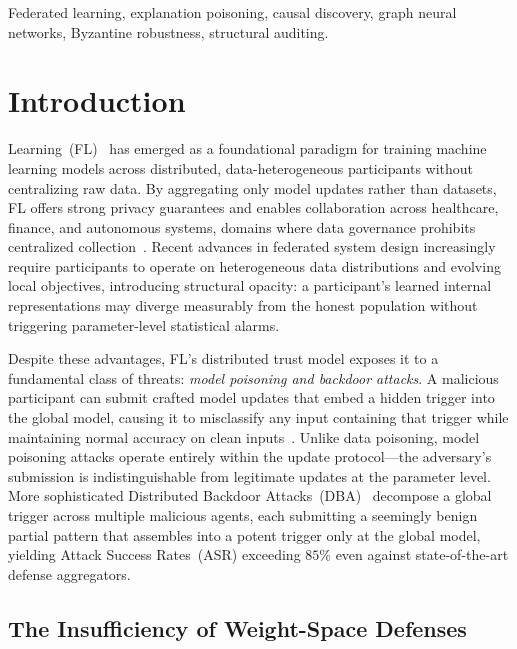 \documentclass[journal]{IEEEtran}
\begin{document}
\begin{IEEEkeywords}
Federated learning, explanation poisoning, causal discovery,
graph neural networks, Byzantine robustness, structural auditing.
\end{IEEEkeywords}

\section{Introduction}
\label{sec:intro}

 Learning~(FL)~\cite{mcmahan2017fedavg} has emerged
as a foundational paradigm for training machine learning models across
distributed, data-heterogeneous participants without centralizing raw data.
By aggregating only model updates rather than datasets, FL offers strong
privacy guarantees and enables collaboration across healthcare, finance, and
autonomous systems, domains where data governance prohibits centralized
collection~\cite{kairouz2021advances,li2020fedsurvey}. Recent advances in
federated system design increasingly require participants to operate on
heterogeneous data distributions and evolving local objectives, introducing
structural opacity: a participant's learned internal representations may
diverge measurably from the honest population without triggering
parameter-level statistical alarms.

Despite these advantages, FL's distributed trust model exposes it to a
fundamental class of threats: \textit{model poisoning and backdoor attacks}.
A malicious participant can submit crafted model updates that embed a
hidden trigger into the global model, causing it to misclassify any input
containing that trigger while maintaining normal accuracy on clean
inputs~\cite{bagdasaryan2020backdoor,chen2017backdoor}. Unlike data poisoning,
model poisoning attacks operate entirely within the update protocol---the
adversary's submission is indistinguishable from legitimate updates at the
parameter level. More sophisticated Distributed Backdoor
Attacks~(DBA)~\cite{xie2020dba} decompose a global trigger across multiple
malicious agents, each submitting a seemingly benign partial pattern that
assembles into a potent trigger only at the global model, yielding
Attack Success Rates~(ASR) exceeding $85\%$ even against state-of-the-art
defense aggregators.

\subsection{The Insufficiency of Weight-Space Defenses}
\end{document}
